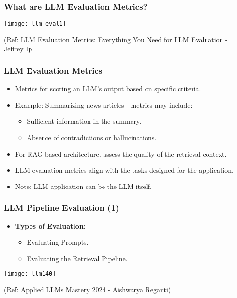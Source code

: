 \begin{frame}[fragile]\frametitle{What are LLM Evaluation Metrics?}


\begin{center}
\texttt{[image: llm\_eval1]}
\end{center}		
		
{\tiny (Ref: LLM Evaluation Metrics: Everything You Need for LLM Evaluation - Jeffrey Ip}
			
			
\end{frame}

\begin{frame}[fragile]\frametitle{LLM Evaluation Metrics}
  \begin{itemize}
    \item Metrics for scoring an LLM's output based on specific criteria.
    \item Example: Summarizing news articles - metrics may include:
      \begin{itemize}
        \item Sufficient information in the summary.
        \item Absence of contradictions or hallucinations.
      \end{itemize}
    \item For RAG-based architecture, assess the quality of the retrieval context.
    \item LLM evaluation metrics align with the tasks designed for the application.
    \item Note: LLM application can be the LLM itself.
  \end{itemize}
\end{frame}


\begin{frame}[fragile]\frametitle{LLM Pipeline Evaluation (1)}
  \begin{itemize}
    \item \textbf{Types of Evaluation:}
      \begin{itemize}
        \item Evaluating Prompts.
        \item Evaluating the Retrieval Pipeline.
      \end{itemize}
  \end{itemize}
  
\begin{center}
\texttt{[image: llm140]}
\end{center}				

{\tiny (Ref: Applied LLMs Mastery 2024 - Aishwarya Reganti)}  
\end{frame}

